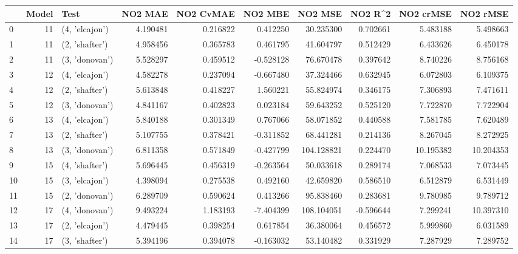 \begin{tabular}{lrlrrrrrrr}
\toprule
{} &  Model &            Test &    NO2 MAE &  NO2 CvMAE &   NO2 MBE &     NO2 MSE &   NO2 R\textasciicircum2 &  NO2 crMSE &   NO2 rMSE \\
\midrule
0  &     11 &  (4, 'elcajon') &   4.190481 &   0.216822 &  0.412250 &   30.235300 &  0.702661 &   5.483188 &   5.498663 \\
1  &     11 &  (2, 'shafter') &   4.958456 &   0.365783 &  0.461795 &   41.604797 &  0.512429 &   6.433626 &   6.450178 \\
2  &     11 &  (3, 'donovan') &   5.528297 &   0.459512 & -0.528128 &   76.670478 &  0.397642 &   8.740226 &   8.756168 \\
3  &     12 &  (4, 'elcajon') &   4.582278 &   0.237094 & -0.667480 &   37.324466 &  0.632945 &   6.072803 &   6.109375 \\
4  &     12 &  (2, 'shafter') &   5.613848 &   0.418227 &  1.560221 &   55.824974 &  0.346175 &   7.306893 &   7.471611 \\
5  &     12 &  (3, 'donovan') &   4.841167 &   0.402823 &  0.023184 &   59.643252 &  0.525120 &   7.722870 &   7.722904 \\
6  &     13 &  (4, 'elcajon') &   5.840188 &   0.301349 &  0.767066 &   58.071852 &  0.440588 &   7.581785 &   7.620489 \\
7  &     13 &  (2, 'shafter') &   5.107755 &   0.378421 & -0.311852 &   68.441281 &  0.214136 &   8.267045 &   8.272925 \\
8  &     13 &  (3, 'donovan') &   6.811358 &   0.571849 & -0.427799 &  104.128821 &  0.224470 &  10.195382 &  10.204353 \\
9  &     15 &  (4, 'shafter') &   5.696445 &   0.456319 & -0.263564 &   50.033618 &  0.289174 &   7.068533 &   7.073445 \\
10 &     15 &  (3, 'elcajon') &   4.398094 &   0.275538 &  0.492160 &   42.659820 &  0.586510 &   6.512879 &   6.531449 \\
11 &     15 &  (2, 'donovan') &   6.289709 &   0.590624 &  0.413266 &   95.838460 &  0.283681 &   9.780985 &   9.789712 \\
12 &     17 &  (4, 'donovan') &   9.493224 &   1.183193 & -7.404399 &  108.104051 & -0.596644 &   7.299241 &  10.397310 \\
13 &     17 &  (2, 'elcajon') &   4.479445 &   0.398254 &  0.617854 &   36.380064 &  0.456572 &   5.999860 &   6.031589 \\
14 &     17 &  (3, 'shafter') &   5.394196 &   0.394078 & -0.163032 &   53.140482 &  0.331929 &   7.287929 &   7.289752 \\

\end{tabular}
